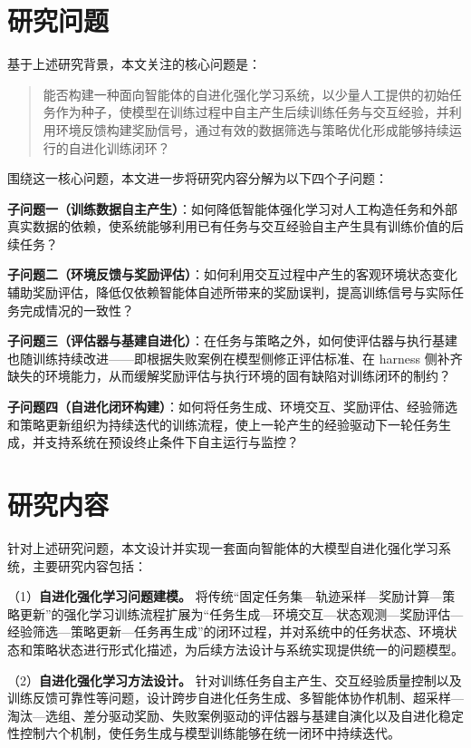 \section{研究问题}

基于上述研究背景，本文关注的核心问题是：

\begin{quote}
能否构建一种面向智能体的自进化强化学习系统，以少量人工提供的初始任务作为种子，使模型在训练过程中自主产生后续训练任务与交互经验，并利用环境反馈构建奖励信号，通过有效的数据筛选与策略优化形成能够持续运行的自进化训练闭环？
\end{quote}

围绕这一核心问题，本文进一步将研究内容分解为以下四个子问题：

\textbf{子问题一（训练数据自主产生）}：如何降低智能体强化学习对人工构造任务和外部真实数据的依赖，使系统能够利用已有任务与交互经验自主产生具有训练价值的后续任务？

\textbf{子问题二（环境反馈与奖励评估）}：如何利用交互过程中产生的客观环境状态变化辅助奖励评估，降低仅依赖智能体自述所带来的奖励误判，提高训练信号与实际任务完成情况的一致性？

\textbf{子问题三（评估器与基建自进化）}：在任务与策略之外，如何使评估器与执行基建也随训练持续改进——即根据失败案例在模型侧修正评估标准、在 harness 侧补齐缺失的环境能力，从而缓解奖励评估与执行环境的固有缺陷对训练闭环的制约？

\textbf{子问题四（自进化闭环构建）}：如何将任务生成、环境交互、奖励评估、经验筛选和策略更新组织为持续迭代的训练流程，使上一轮产生的经验驱动下一轮任务生成，并支持系统在预设终止条件下自主运行与监控？

\section{研究内容}

针对上述研究问题，本文设计并实现一套面向智能体的大模型自进化强化学习系统，主要研究内容包括：

（1）\textbf{自进化强化学习问题建模。} 将传统“固定任务集—轨迹采样—奖励计算—策略更新”的强化学习训练流程扩展为“任务生成—环境交互—状态观测—奖励评估—经验筛选—策略更新—任务再生成”的闭环过程，并对系统中的任务状态、环境状态和策略状态进行形式化描述，为后续方法设计与系统实现提供统一的问题模型。

（2）\textbf{自进化强化学习方法设计。} 针对训练任务自主产生、交互经验质量控制以及训练反馈可靠性等问题，设计跨步自进化任务生成、多智能体协作机制、超采样—淘汰—选组、差分驱动奖励、失败案例驱动的评估器与基建自演化以及自进化稳定性控制六个机制，使任务生成与模型训练能够在统一闭环中持续迭代。

